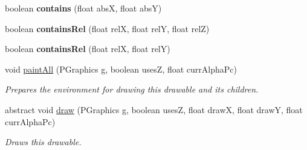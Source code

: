 \begin{DoxyCompactItemize}
\item 
\hypertarget{classhype_1_1core_1_1drawable_1_1_h_drawable_ab71889d2e71d68c841d869c81c4d9413}{boolean {\bfseries contains} (float abs\-X, float abs\-Y)}\label{classhype_1_1core_1_1drawable_1_1_h_drawable_ab71889d2e71d68c841d869c81c4d9413}

\item 
\hypertarget{classhype_1_1core_1_1drawable_1_1_h_drawable_a8ae24b40927238f1be71ad4ff3120874}{boolean {\bfseries contains\-Rel} (float rel\-X, float rel\-Y, float rel\-Z)}\label{classhype_1_1core_1_1drawable_1_1_h_drawable_a8ae24b40927238f1be71ad4ff3120874}

\item 
\hypertarget{classhype_1_1core_1_1drawable_1_1_h_drawable_acd096b75e5eb22539a74db0528bf14a7}{boolean {\bfseries contains\-Rel} (float rel\-X, float rel\-Y)}\label{classhype_1_1core_1_1drawable_1_1_h_drawable_acd096b75e5eb22539a74db0528bf14a7}

\item 
void \hyperlink{classhype_1_1core_1_1drawable_1_1_h_drawable_a700c4d4a347c13048ccfb92ea4f6f50b}{paint\-All} (P\-Graphics g, boolean uses\-Z, float curr\-Alpha\-Pc)
\begin{DoxyCompactList}\small\item\em Prepares the environment for drawing this drawable and its children. \end{DoxyCompactList}\item 
abstract void \hyperlink{classhype_1_1core_1_1drawable_1_1_h_drawable_ae06fef8620c103f6656b9c57a1f0dacd}{draw} (P\-Graphics g, boolean uses\-Z, float draw\-X, float draw\-Y, float curr\-Alpha\-Pc)
\begin{DoxyCompactList}\small\item\em Draws this drawable. \end{DoxyCompactList}\end{DoxyCompactItemize}
